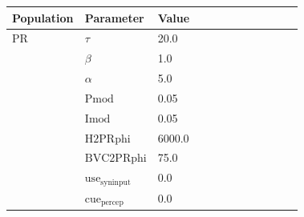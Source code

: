 \documentclass{article}
\begin{document}
\noindent
\begin{tabularx}{\linewidth}{|p{0.25\linewidth}|p{0.25\linewidth}|X|}\hline
\textbf{Population} & \textbf{Parameter} & \textbf{Value}   \\ \hline

    PR             & $\tau$        & 20.0  \\ \hline

                 & $\beta$        & 1.0  \\ \hline

                 & $\alpha$        & 5.0  \\ \hline

                 & ${\text{Pmod}}$        & 0.05  \\ \hline

                 & ${\text{Imod}}$        & 0.05  \\ \hline

                 & ${\text{H2PRphi}}$        & 6000.0  \\ \hline

                 & ${\text{BVC2PRphi}}$        & 75.0  \\ \hline

                 & ${\text{use}}_{\text{syninput}}$        & 0.0  \\ \hline

                 & ${\text{cue}}_{\text{percep}}$        & 0.0  \\ \hline

\end{tabularx}

\vspace{2ex}
\end{document}
